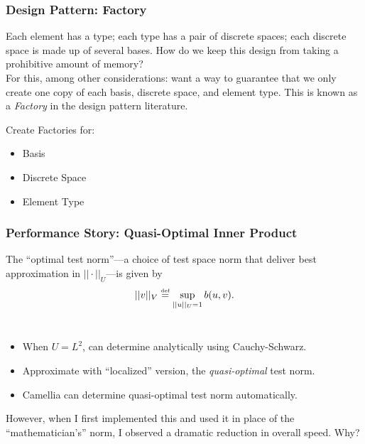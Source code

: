 \documentclass[mathserif]{beamer}
\newcommand{\eqdef}{\stackrel{\text{\tiny def}}{=}}
\begin{document}
\begin{frame}
\frametitle{Design Pattern: Factory}

Each element has a type; each type has a pair of discrete spaces; each discrete space is made up of several bases.  How do we keep this design from taking a prohibitive amount of memory?\\
\vspace{3 mm}
For this, among other considerations: want a way to guarantee that we only create one copy of each basis, discrete
space, and element type.  This is known as a \emph{Factory} in the design pattern literature.

\begin{block}{Create Factories for:}
\begin{itemize}
\item Basis
\item Discrete Space
\item Element Type
\end{itemize}
\end{block}

\end{frame}

\begin{frame}
\frametitle{Performance Story: Quasi-Optimal Inner Product}

The ``optimal test norm''---a choice of test space norm that deliver best approximation in $||\cdot||_{U}$---is given by 
\begin{align*}
||v||_{V}\eqdef \sup_{||u||_{U}=1} b(u,v).
\end{align*}
\\
\begin{itemize}
\item When $U=L^{2}$, can determine analytically using Cauchy-Schwarz.
\item Approximate with ``localized'' version, the \emph{quasi-optimal} test norm.
\item Camellia can determine quasi-optimal test norm automatically.
\end{itemize}

However, when I first implemented this and used it in place of the ``mathematician's'' norm, I observed a dramatic reduction in overall speed.  Why?

\end{frame}
\end{document}
